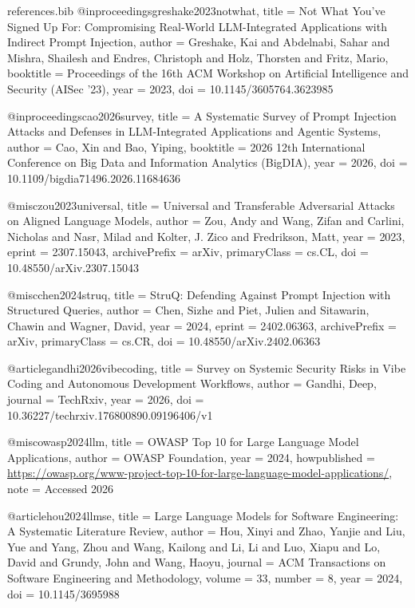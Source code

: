 \begin{filecontents*}{references.bib}
@inproceedings{greshake2023notwhat,
  title     = {Not What You've Signed Up For: Compromising Real-World
               {LLM}-Integrated Applications with Indirect Prompt Injection},
  author    = {Greshake, Kai and Abdelnabi, Sahar and Mishra, Shailesh and
               Endres, Christoph and Holz, Thorsten and Fritz, Mario},
  booktitle = {Proceedings of the 16th {ACM} Workshop on Artificial Intelligence
               and Security ({AISec} '23)},
  year      = {2023},
  doi       = {10.1145/3605764.3623985}
}

@inproceedings{cao2026survey,
  title     = {A Systematic Survey of Prompt Injection Attacks and Defenses in
               {LLM}-Integrated Applications and Agentic Systems},
  author    = {Cao, Xin and Bao, Yiping},
  booktitle = {2026 12th International Conference on Big Data and Information
               Analytics ({BigDIA})},
  year      = {2026},
  doi       = {10.1109/bigdia71496.2026.11684636}
}

@misc{zou2023universal,
  title         = {Universal and Transferable Adversarial Attacks on Aligned
                   Language Models},
  author        = {Zou, Andy and Wang, Zifan and Carlini, Nicholas and Nasr, Milad and
                   Kolter, J. Zico and Fredrikson, Matt},
  year          = {2023},
  eprint        = {2307.15043},
  archivePrefix = {arXiv},
  primaryClass  = {cs.CL},
  doi           = {10.48550/arXiv.2307.15043}
}

@misc{chen2024struq,
  title         = {{StruQ}: Defending Against Prompt Injection with Structured Queries},
  author        = {Chen, Sizhe and Piet, Julien and Sitawarin, Chawin and Wagner, David},
  year          = {2024},
  eprint        = {2402.06363},
  archivePrefix = {arXiv},
  primaryClass  = {cs.CR},
  doi           = {10.48550/arXiv.2402.06363}
}

@article{gandhi2026vibecoding,
  title   = {Survey on Systemic Security Risks in Vibe Coding and Autonomous
             Development Workflows},
  author  = {Gandhi, Deep},
  journal = {TechRxiv},
  year    = {2026},
  doi     = {10.36227/techrxiv.176800890.09196406/v1}
}

@misc{owasp2024llm,
  title        = {{OWASP} Top 10 for Large Language Model Applications},
  author       = {{OWASP Foundation}},
  year         = {2024},
  howpublished = {\url{https://owasp.org/www-project-top-10-for-large-language-model-applications/}},
  note         = {Accessed 2026}
}

@article{hou2024llmse,
  title   = {Large Language Models for Software Engineering: A Systematic
             Literature Review},
  author  = {Hou, Xinyi and Zhao, Yanjie and Liu, Yue and Yang, Zhou and
             Wang, Kailong and Li, Li and Luo, Xiapu and Lo, David and
             Grundy, John and Wang, Haoyu},
  journal = {{ACM} Transactions on Software Engineering and Methodology},
  volume  = {33},
  number  = {8},
  year    = {2024},
  doi     = {10.1145/3695988}
}


\end{filecontents*}
